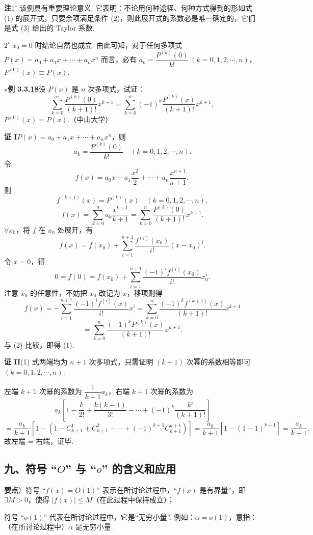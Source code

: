 \documentclass[UTF8, 12pt, fontset=fandol, oneside]{ctexart}
\begin{document}
\noindent\textbf{注}\quad $1^\circ$ 该例具有重要理论意义. 它表明：不论用何种途径、何种方式得到的形如式 (1) 的展开式，只要余项满足条件 (2)，则此展开式的系数必是唯一确定的，它们是式 (3) 给出的 Taylor 系数.

$2^\circ$ $x_0=0$ 时结论自然也成立. 由此可知，对于任何多项式 $P(x)=a_0+a_1x+\cdots+a_nx^n$ 而言，必有 $a_k=\dfrac{P^{(k)}(0)}{k!}\ (k=0,1,2,\cdots,n)$，$P^{(0)}(x)\equiv P(x)$.

\noindent\textbf{$\star$例 3.3.18}\quad 设 $P(x)$ 是 $n$ 次多项式，试证：
\[
  \sum_{k=0}^n\frac{P^{(k)}(0)}{(k+1)!}x^{k+1}
  =\sum_{k=0}^n(-1)^k\frac{P^{(k)}(x)}{(k+1)!}x^{k+1}, \tag{1}
\]
$P^{(0)}(x)=P(x)$.（中山大学）

\noindent\textbf{证 I}\quad $P(x)=a_0+a_1x+\cdots+a_nx^n$，则
\[
  a_k=\frac{P^{(k)}(0)}{k!}\quad(k=0,1,2,\cdots,n).
\]
令
\[
  f(x)=a_0x+a_1\frac{x^2}{2}+\cdots+a_n\frac{x^{n+1}}{n+1},
\]
则
\[
  f^{(k+1)}(x)=P^{(k)}(x)\quad(k=0,1,2,\cdots,n),
\]
\[
  f(x)=\sum_{k=0}^n a_k\frac{x^{k+1}}{k+1}
  =\sum_{k=0}^n\frac{P^{(k)}(0)}{(k+1)!}x^{k+1}. \tag{2}
\]
$\forall x_0$，将 $f$ 在 $x_0$ 处展开，有
\[
  f(x)=f(x_0)+\sum_{i=1}^{n+1}\frac{f^{(i)}(x_0)}{i!}(x-x_0)^i.
\]
令 $x=0$，得
\[
  0=f(0)=f(x_0)+\sum_{i=1}^{n+1}\frac{(-1)^if^{(i)}(x_0)}{i!}x_0^i.
\]
注意 $x_0$ 的任意性，不妨把 $x_0$ 改记为 $x$，移项则得
\[
  f(x)=-\sum_{i=1}^{n+1}\frac{(-1)^if^{(i)}(x)}{i!}x^i
  =\sum_{k=0}^n\frac{(-1)^k f^{(k+1)}(x)}{(k+1)!}x^{k+1}
\]
\[
  =\sum_{k=0}^n\frac{(-1)^kP^{(k)}(x)}{(k+1)!}x^{k+1}.
\]
与 (2) 比较，即得 (1).

\noindent\textbf{证 II}\quad (1) 式两端均为 $n+1$ 次多项式，只需证明 $(k+1)$ 次幂的系数相等即可 $(k=0,1,2,\cdots,n)$.

左端 $k+1$ 次幂的系数为 $\dfrac1{k+1}a_k$，右端 $k+1$ 次幂的系数为
\[
  a_k\left[1-\frac{k}{2!}+\frac{k(k-1)}{3!}-\cdots+(-1)^k\frac{k!}{(k+1)!}\right]
\]
\[
  =\frac{a_k}{k+1}\left[1-\left(1-C_{k+1}^1+C_{k+1}^2-\cdots+(-1)^{k+1}C_{k+1}^{k+1}\right)\right]
  =\frac{a_k}{k+1}\left[1-(1-1)^{k+1}\right]=\frac{a_k}{k+1}.
\]
故左端 = 右端，证毕.

\subsection*{九、符号 ``$O$'' 与 ``$o$'' 的含义和应用}

\noindent\textbf{要点}）符号 ``$f(x)=O(1)$'' 表示在所讨论过程中，``$f(x)$ 是有界量''，即 $\exists M>0$，使得 $|f(x)|\le M$（在此过程中保持成立）；

符号 ``$o(1)$'' 代表在所讨论过程中，它是``无穷小量''. 例如：$\alpha=o(1)$，意指：（在所讨论过程中）$\alpha$ 是无穷小量.
\end{document}
